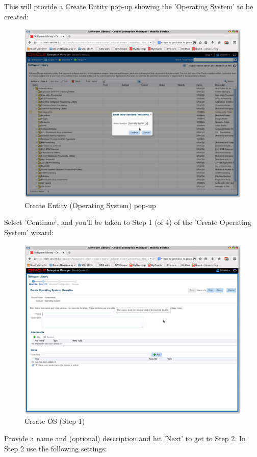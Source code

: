 \documentclass[11pt]{article}
\begin{document}
This will provide a Create Entity pop-up showing the 'Operating System' to be created:
\begin{figure}[htb]
\centering
\includegraphics[width=.9\linewidth]{./images/Create_Entity_BMP_OS.png}
\caption{Create Entity (Operating System) pop-up}
\end{figure}
\clearpage

Select 'Continue', and you'll be taken to Step 1 (of 4) of the 'Create Operating System' wizard:
\begin{figure}[htb]
\centering
\includegraphics[width=.9\linewidth]{./images/Create_OS_1.png}
\caption{Create OS (Step 1)}
\end{figure}
\clearpage

Provide a name and (optional) description and hit 'Next' to get to Step 2. In Step 2 use the following settings:
\end{document}
